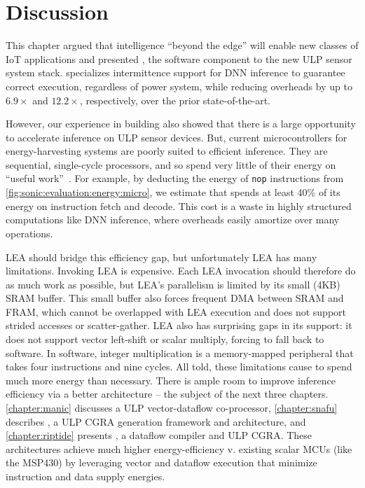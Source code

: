 \section{Discussion}
\label{sonic:discuss}
This chapter argued that intelligence ``beyond the edge'' will enable
new classes of IoT applications and presented \sonic, the software component to the new ULP sensor system stack.
% 
\sonic specializes intermittence support for DNN inference to guarantee correct
execution, regardless of power system, while reducing overheads by
up to $6.9\times$ and $12.2\times$, respectively, over the prior state-of-the-art.

However, our experience in building \sonictails also showed that there is a large
opportunity to accelerate inference on ULP sensor devices.
% 
But, current microcontrollers for energy-harvesting systems are poorly
suited to efficient inference.
% 
They are sequential, single-cycle processors,
and so spend very little of their energy on ``useful work''~\cite{horowitz:isscc14:energy-keynote}.
%
For example, by deducting the energy of \texttt{nop} instructions from \autoref{fig:sonic:evaluation:energy:micro},
we estimate that \sonic spends at least 40\% of its energy on instruction fetch and decode.
%
This cost is a waste in highly structured computations like DNN inference,
where overheads easily amortize over many operations. %

LEA should bridge this efficiency gap, but unfortunately LEA has many limitations.
%
Invoking LEA is expensive. Each LEA invocation should therefore do as much work as
possible, but LEA's parallelism is limited by its small (4KB) SRAM buffer.
%
This small buffer also forces frequent DMA between SRAM and FRAM,
which cannot be overlapped with LEA execution
and does not support strided accesses or scatter-gather.
%
LEA also has surprising gaps in its support:
it does not support vector left-shift or scalar multiply,
forcing \tails to fall back to software.
%
In software, integer multiplication is a memory-mapped peripheral that takes
four instructions and nine cycles.
%
All told, these limitations cause \sonictails to spend much more energy than necessary.
% 
There is ample room to improve inference efficiency via a better architecture -- the subject of the next three chapters.
% 
\autoref{chapter:manic} discusses \manic a ULP vector-dataflow co-processor, \autoref{chapter:snafu} describes \snafu, a ULP CGRA generation framework and architecture, and \autoref{chapter:riptide} presents \riptide, a dataflow compiler and ULP CGRA.
% 
These architectures achieve much higher energy-efficiency v. existing scalar MCUs (like the MSP430) by leveraging vector and dataflow execution that minimize instruction and data supply energies.

